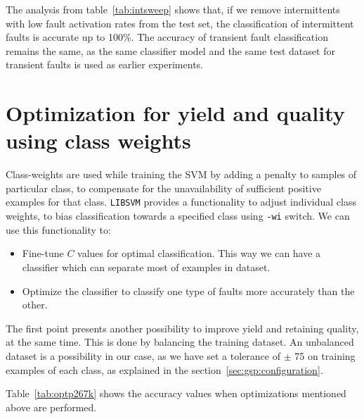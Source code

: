 The analysis from table~\ref{tab:intsweep} shows that, if we remove intermittents with low fault activation rates from the test set, the classification of intermittent faults is accurate up to 100\%. The accuracy of transient fault classification remains the same, as the same classifier model and the same test dataset for transient faults is used as earlier experiments.

\section{Optimization for yield and quality using class weights}
\label{sec:ww}

Class-weights are used while training the SVM by adding a penalty to samples of particular class, to compensate for the unavailability of sufficient positive examples for that class. \texttt{LIBSVM} provides a functionality to adjust individual class weights, to bias classification towards a specified class using \texttt{-wi} switch. We can use this functionality to:
\begin{itemize}
  \item Fine-tune $C$ values for optimal classification. This way we can have a classifier which can separate most of examples in dataset.
  \item Optimize the classifier to classify one type of faults more accurately than the other.
\end{itemize}

The first point presents another possibility to improve yield and retaining quality, at the same time. This is done by balancing the training dataset. An unbalanced dataset is a possibility in our case, as we have set a tolerance of $\pm$ 75 on training examples of each class, as explained in the section~\ref{sec:gsp:configuration}. 

Table~\ref{tab:optp267k} shows the accuracy values when optimizations mentioned above are performed.

